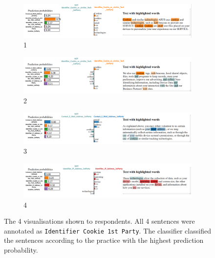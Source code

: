 \begin{figure}[!ht]
  \begin{subfigure}[b]{1\textwidth}
    \centering
    \includegraphics[width=1\linewidth]{figures/explanations_visualisations/section_4a/Picture1.png}
    \caption{1}
  \end{subfigure}
  \hfill
  \begin{subfigure}[b]{1\textwidth}
    \centering
    \includegraphics[width=1\linewidth]{figures/explanations_visualisations/section_4a/Picture2.png}
    \caption{2}
  \end{subfigure}
  \hfill
  \begin{subfigure}[b]{1\textwidth}
    \centering
    \includegraphics[width=1\linewidth]{figures/explanations_visualisations/section_4a/Picture3.png}
    \caption{3}
  \end{subfigure}
  \hfill
  \begin{subfigure}[b]{1\textwidth}
    \centering
    \includegraphics[width=1\linewidth]{figures/explanations_visualisations/section_4a/Picture4.png}
    \caption{4}
  \end{subfigure}
  \caption{The 4 visualisations shown to respondents. All 4 sentences were annotated as \texttt{Identifier Cookie 1st Party}. The classifier classified the sentences according to the practice with the highest prediction probability.}
  \label{fig:part4_explanations}
\end{figure}

